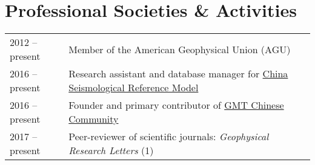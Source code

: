 \section*{Professional Societies \& Activities}

\begin{tabular}{ll}
2012 -- present & Member of the American Geophysical Union (AGU) \\
2016 -- present & Research assistant and database manager for \href{http://chinageorefmodel.org/}{China Seismological Reference Model} \\
2016 -- present & Founder and primary contributor of \href{http://gmt-china.org/}{GMT Chinese Community} \\
2017 -- present & Peer-reviewer of scientific journals: \textit{Geophysical Research Letters} (1) \\
\end{tabular}
